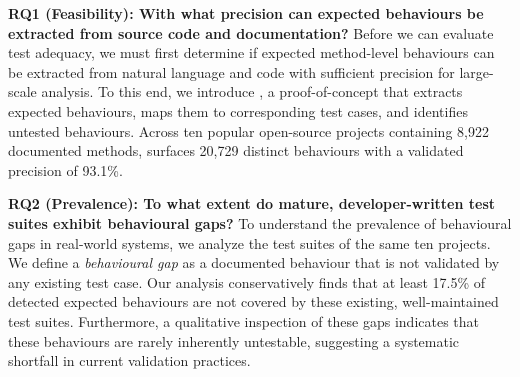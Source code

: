 
\textbf{RQ1 (Feasibility): With what precision can expected behaviours be extracted from source code and documentation?}
Before we can evaluate test adequacy, we must first determine if expected method-level behaviours can be extracted from natural language and code with sufficient precision for large-scale analysis. To this end, we introduce \toolname{}, a proof-of-concept that extracts expected behaviours, maps them to corresponding test cases, and identifies untested behaviours. Across ten popular open-source projects containing 8,922 documented methods, \toolname{} surfaces 20,729 distinct behaviours with a validated precision of 93.1\%.



\textbf{RQ2 (Prevalence): To what extent do mature, developer-written test suites exhibit behavioural gaps?}
To understand the prevalence of behavioural gaps in real-world systems, we analyze the test suites of the same ten projects. We define a \textit{behavioural gap} as a documented behaviour that is not validated by any existing test case. Our analysis conservatively finds that at least 17.5\% of detected expected behaviours are not covered by these existing, well-maintained test suites. Furthermore, a qualitative inspection of these gaps indicates that these behaviours are rarely inherently untestable, suggesting a systematic shortfall in current validation practices.

